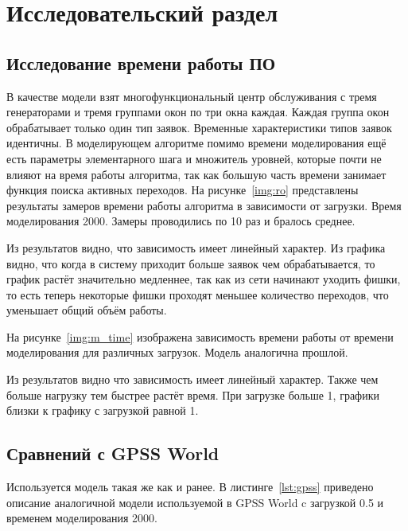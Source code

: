 \chapter{Исследовательский раздел}
	
\section{Исследование времени работы ПО}

В качестве модели взят многофункциональный центр обслуживания с тремя генераторами и тремя группами окон по три окна каждая. Каждая группа окон обрабатывает только один тип заявок. Временные характеристики типов заявок идентичны. В моделирующем алгоритме помимо времени моделирования ещё есть параметры элементарного шага и множитель уровней, которые почти не влияют на время работы алгоритма, так как большую часть времени занимает функция поиска активных переходов.
На рисунке~\ref{img:ro} представлены результаты замеров времени работы алгоритма в зависимости от загрузки. Время моделирования 2000. Замеры проводились по 10 раз и бралось среднее.

\FloatBarrier

Из результатов видно, что зависимость имеет линейный характер. Из графика видно, что когда в систему приходит больше заявок чем обрабатывается, то график растёт значительно медленнее, так как из сети начинают уходить фишки, то есть теперь некоторые фишки проходят меньшее количество переходов, что уменьшает общий объём работы.

На рисунке~\ref{img:m_time} изображена зависимость времени работы от времени моделирования для различных загрузок. Модель аналогична прошлой.  

\FloatBarrier

Из результатов видно что зависимость имеет линейный характер. Также чем больше нагрузку тем быстрее растёт время. При загрузке больше 1, графики близки к графику с загрузкой равной 1.

\section{Сравнений с GPSS World}

Используется модель такая же как и ранее. В листинге~\ref{lst:gpss} приведено описание аналогичной модели используемой в GPSS World c загрузкой 0.5 и временем моделирования 2000.

